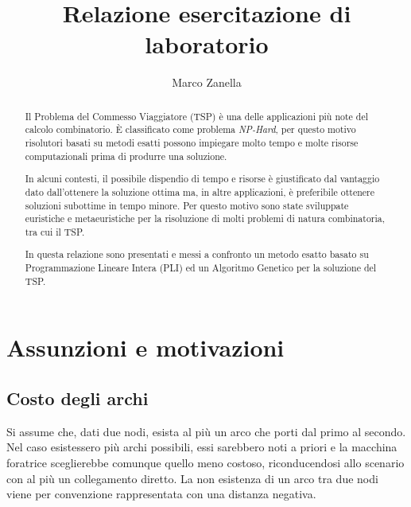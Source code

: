 \documentclass[a4paper, 10pt]{report}
\begin{document}
\hypersetup{pageanchor=false}
\title{Relazione esercitazione di laboratorio}
\author{Marco Zanella}
\maketitle

\tableofcontents


\begin{abstract}
Il Problema del Commesso Viaggiatore (TSP) è una delle applicazioni più
note del calcolo combinatorio. È classificato come problema \emph{NP-Hard},
per questo motivo risolutori basati su metodi esatti possono impiegare
molto tempo e molte risorse computazionali prima di produrre una soluzione.

In alcuni contesti, il possibile dispendio di tempo e risorse è giustificato
dal vantaggio dato dall'ottenere la soluzione ottima ma, in altre
applicazioni, è preferibile ottenere soluzioni subottime in tempo minore.
Per questo motivo sono state sviluppate euristiche e metaeuristiche per la
risoluzione di molti problemi di natura combinatoria, tra cui il TSP.

In questa relazione sono presentati e messi a confronto un metodo esatto
basato su Programmazione Lineare Intera (PLI) ed un Algoritmo Genetico per
la soluzione del TSP.
\end{abstract}
\hypersetup{pageanchor=true}



\chapter{Assunzioni e motivazioni}
\section{Costo degli archi}
\label{sec:assumptions_cost_of_arcs}
Si assume che, dati due nodi, esista al più un arco che porti dal
primo al secondo. Nel caso esistessero più archi possibili, essi
sarebbero noti a priori e la macchina foratrice sceglierebbe comunque
quello meno costoso, riconducendosi allo scenario con al più un
collegamento diretto. La non esistenza di un arco tra due nodi viene
per convenzione rappresentata con una distanza negativa.
\end{document}
